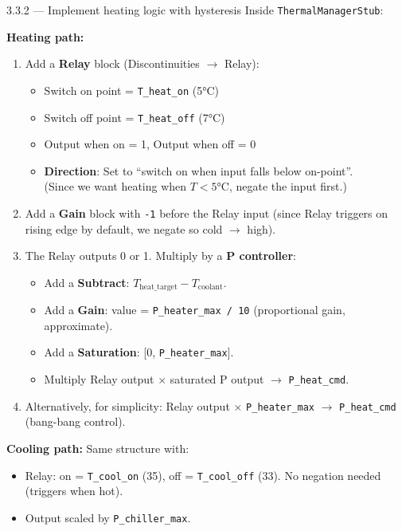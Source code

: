 \documentclass[11pt,a4paper]{article}
\begin{document}
\begin{guistep}{3.3.2 — Implement heating logic with hysteresis}
Inside \texttt{ThermalManagerStub}:

\textbf{Heating path:}
\begin{enumerate}
    \item Add a \textbf{Relay} block (Discontinuities $\to$ Relay):
    \begin{itemize}
        \item Switch on point = \texttt{T\_heat\_on} (5\si{\degreeCelsius})
        \item Switch off point = \texttt{T\_heat\_off} (7\si{\degreeCelsius})
        \item Output when on = 1, Output when off = 0
        \item \textbf{Direction}: Set to ``switch on when input falls below on-point''.\\
              (Since we want heating when $T < 5$\si{\degreeCelsius}, negate the input first.)
    \end{itemize}
    \item Add a \textbf{Gain} block with \texttt{-1} before the Relay input (since Relay triggers on rising edge by default, we negate so cold $\to$ high).
    \item The Relay outputs 0 or 1. Multiply by a \textbf{P controller}:
    \begin{itemize}
        \item Add a \textbf{Subtract}: $T_\text{heat\_target} - T_\text{coolant}$.
        \item Add a \textbf{Gain}: value = \texttt{P\_heater\_max / 10} (proportional gain, approximate).
        \item Add a \textbf{Saturation}: [0, \texttt{P\_heater\_max}].
        \item Multiply Relay output $\times$ saturated P output $\to$ \texttt{P\_heat\_cmd}.
    \end{itemize}
    \item Alternatively, for simplicity: Relay output $\times$ \texttt{P\_heater\_max} $\to$ \texttt{P\_heat\_cmd} (bang-bang control).
\end{enumerate}

\textbf{Cooling path:} Same structure with:
\begin{itemize}
    \item Relay: on = \texttt{T\_cool\_on} (35), off = \texttt{T\_cool\_off} (33). No negation needed (triggers when hot).
    \item Output scaled by \texttt{P\_chiller\_max}.
\end{itemize}
\end{guistep}
\end{document}
